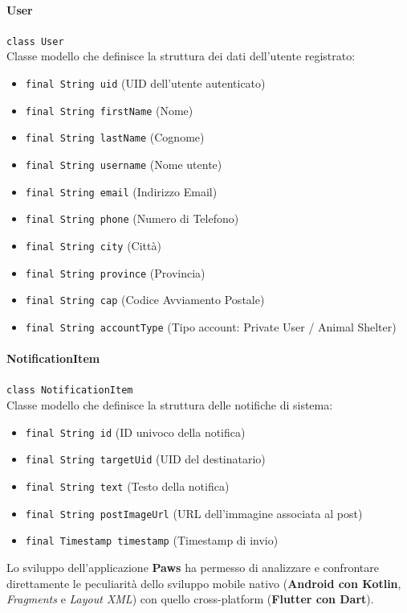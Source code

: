\documentclass[a4paper]{report}
\begin{document}
\paragraph{User}
\texttt{class User} \\
Classe modello che definisce la struttura dei dati dell'utente registrato:
\begin{itemize}
    \item \texttt{final String uid} (UID dell'utente autenticato)
    \item \texttt{final String firstName} (Nome)
    \item \texttt{final String lastName} (Cognome)
    \item \texttt{final String username} (Nome utente)
    \item \texttt{final String email} (Indirizzo Email)
    \item \texttt{final String phone} (Numero di Telefono)
    \item \texttt{final String city} (Città)
    \item \texttt{final String province} (Provincia)
    \item \texttt{final String cap} (Codice Avviamento Postale)
    \item \texttt{final String accountType} (Tipo account: Private User / Animal Shelter)
\end{itemize}

\paragraph{NotificationItem}
\texttt{class NotificationItem} \\
Classe modello che definisce la struttura delle notifiche di sistema:
\begin{itemize}
    \item \texttt{final String id} (ID univoco della notifica)
    \item \texttt{final String targetUid} (UID del destinatario)
    \item \texttt{final String text} (Testo della notifica)
    \item \texttt{final String postImageUrl} (URL dell'immagine associata al post)
    \item \texttt{final Timestamp timestamp} (Timestamp di invio)
\end{itemize}


Lo sviluppo dell’applicazione \textbf{Paws} ha permesso di analizzare e confrontare direttamente le peculiarità dello sviluppo mobile nativo (\textbf{Android con Kotlin}, \textit{Fragments} e \textit{Layout XML}) con quello cross-platform (\textbf{Flutter con Dart}).
\end{document}
